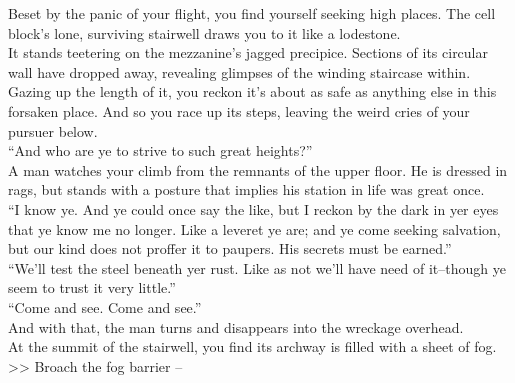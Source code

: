 Beset by the panic of your flight, you find yourself seeking high places. The cell block’s lone, surviving stairwell draws you to it like a lodestone.\\

It stands teetering on the mezzanine’s jagged precipice. Sections of its circular wall have dropped away, revealing glimpses of the winding staircase within. Gazing up the length of it, you reckon it’s about as safe as anything else in this forsaken place. And so you race up its steps, leaving the weird cries of your pursuer below.\\

“And who are ye to strive to such great heights?”\\

A man watches your climb from the remnants of the upper floor. He is dressed in rags, but stands with a posture that implies his station in life was great once.\\

“I know ye. And ye could once say the like, but I reckon by the dark in yer eyes that ye know me no longer. Like a leveret ye are; and ye come seeking salvation, but our kind does not proffer it to paupers. His secrets must be earned.”\\

“We’ll test the steel beneath yer rust. Like as not we’ll have need of it--though ye seem to trust it very little.”\\

“Come and see. Come and see.”\\

And with that, the man turns and disappears into the wreckage overhead.\\

At the summit of the stairwell, you find its archway is filled with a sheet of fog.\\

>> Broach the fog barrier -- 